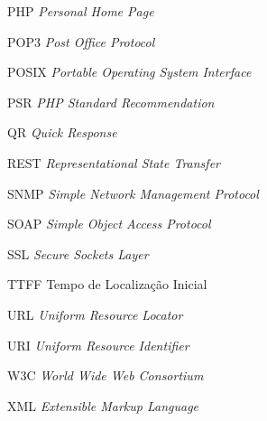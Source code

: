 \begin{siglas}
    \item[PHP] \textit{Personal Home Page}
    \item[POP3] \textit{Post Office Protocol}
    \item[POSIX] \textit{Portable Operating System Interface}
    \item[PSR] \textit{PHP Standard Recommendation}
    \item[QR] \textit{Quick Response}
    \item[REST] \textit{Representational State Transfer}
    \item[SNMP] \textit{Simple Network Management Protocol}
    \item[SOAP] \textit{Simple Object Access Protocol}
    \item[SSL] \textit{Secure Sockets Layer}
    \item[TTFF] Tempo de Localização Inicial
    \item[URL] \textit{Uniform Resource Locator}
    \item[URI] \textit{Uniform Resource Identifier}
    \item[W3C] \textit{World Wide Web Consortium}
    \item[XML] \textit{Extensible Markup Language}
\end{siglas}

